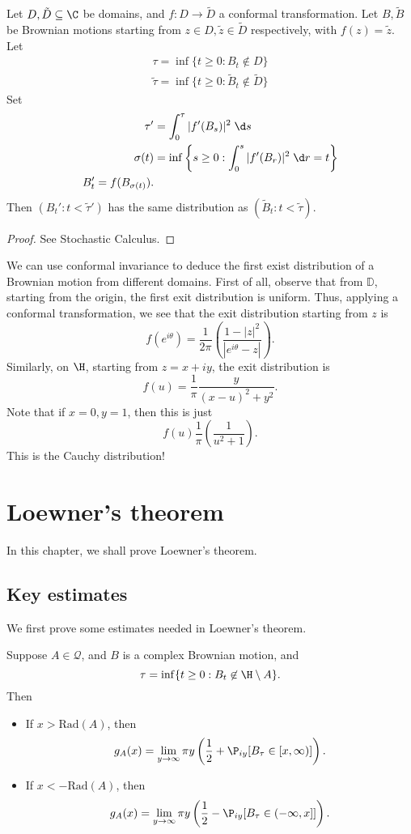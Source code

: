 \documentclass[a4paper]{article}
\renewcommand\D{\mathbb{D}}
\newcommand\rad{\mathrm{Rad}}
\begin{document}
\begin{thm}
  Let $D, \tilde{D} \subseteq \C$ be domains, and $f: D \to \tilde{D}$ a conformal transformation. Let $B, \tilde{B}$ be Brownian motions starting from $z \in D, \tilde{z} \in \tilde{D}$ respectively, with $f(z) = \tilde{z}$. Let
  \begin{align*}
    \tau = \inf\{t \geq 0: B_t \not \in D\}\\
    \tilde{\tau} = \inf\{t \geq 0: \tilde{B}_t \not \in \tilde{D}\}
  \end{align*}
  Set
  \begin{align*}
    \tau' &= \int_0^\tau |f'(B_s)|^2\;\d s\\
    \sigma(t) &= \inf\left\{s \geq 0 : \int_0^s |f'(B_r)|^2\;\d r = t\right\}\\
    B_t' = f(B_{\sigma(t)}).
  \end{align*}
  Then $(B_t' : t < \tilde{\tau}')$ has the same distribution as $(\tilde{B}_t: t < \tilde{\tau})$.
\end{thm}

\begin{proof}
  See Stochastic Calculus.
\end{proof}

\begin{eg}
  We can use conformal invariance to deduce the first exist distribution of a Brownian motion from different domains. First of all, observe that from $\D$, starting from the origin, the first exit distribution is uniform. Thus, applying a conformal transformation, we see that the exit distribution starting from $z$ is
  \[
    f(e^{i\theta}) = \frac{1}{2\pi}\left(\frac{1 - |z|^2}{ |e^{i\theta} - z|}\right).
  \]
  Similarly, on $\H$, starting from $z = x + iy$, the exit distribution is
  \[
    f(u) = \frac{1}{\pi} \frac{y}{(x - u)^2 + y^2}.
  \]
  Note that if $x = 0, y = 1$, then this is just
  \[
    f(u) \frac{1}{\pi}\left(\frac{1}{u^2 + 1}\right).
  \]
  This is the Cauchy distribution!
\end{eg}

\section{Loewner's theorem}
In this chapter, we shall prove Loewner's theorem.
\subsection{Key estimates}
We first prove some estimates needed in Loewner's theorem.
\begin{prop}
  Suppose $A \in \mathcal{Q}$, and $B$ is a complex Brownian motion, and
  \[
    \tau = \inf \{t \geq 0: B_t \not \in \H \setminus A\}.
  \]
  Then
  \begin{itemize}
    \item If $x > \rad(A)$, then
      \[
        g_A(x) = \lim_{y \to \infty} \pi y \left(\frac{1}{2} + \P_{iy} [B_\tau \in [x, \infty)]\right).
      \]
    \item If $x < -\rad(A)$, then
      \[
        g_A(x) = \lim_{y \to \infty} \pi y \left(\frac{1}{2} - \P_{iy}[B_\tau \in (-\infty, x]]\right).
      \]
  \end{itemize}
\end{prop}
\end{document}
